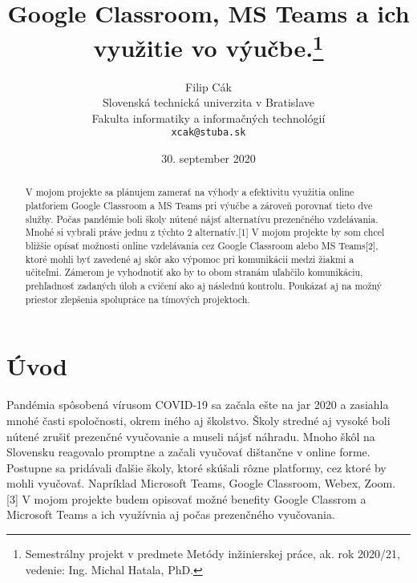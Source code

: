 \documentclass[10pt,twoside,slovak,a4paper]{article}
\title{Google Classroom,  MS Teams a ich využitie vo výučbe.\thanks{Semestrálny projekt v predmete Metódy inžinierskej práce, ak. rok 2020/21, vedenie: Ing. Michal Hatala, PhD. }}
\author{Filip Cák\\[2pt]
	{\small Slovenská technická univerzita v Bratislave}\\
	{\small Fakulta informatiky a informačných technológií}\\
	{\small \texttt{xcak@stuba.sk}}
	}
\date{\small 30. september 2020} %
\begin{document}
\maketitle

\begin{abstract}
V mojom projekte sa plánujem zamerať na výhody a efektivitu využitia online platforiem Google Classroom a MS Teams pri výučbe a zároveň porovnať tieto dve služby. Počas pandémie boli školy nútené nájsť alternatívu prezenčného vzdelávania. Mnohé si vybrali práve jednu z týchto 2 alternatív.[1] V mojom projekte by som chcel bližšie opísať možnosti online vzdelávania cez Google Classroom alebo MS Teams[2], ktoré mohli byť zavedené aj skôr ako výpomoc pri komunikácii medzi žiakmi a učiteľmi. Zámerom je vyhodnotiť ako by to obom stranám uľahčilo komunikáciu, prehľadnosť zadaných úloh a cvičení ako aj následnú kontrolu. Poukázať aj na možný priestor zlepšenia spolupráce na tímových projektoch.
\end{abstract}



\section{Úvod}

Pandémia spôsobená vírusom COVID-19 sa začala ešte na jar 2020 a zasiahla mnohé časti spoločnosti, okrem iného aj školstvo. Školy stredné aj vysoké boli nútené zrušiť prezenčné vyučovanie a museli nájsť náhradu. Mnoho škôl na Slovensku reagovalo promptne a začali vyučovať dištančne v online forme. Postupne sa pridávali ďalšie školy, ktoré skúšali rôzne platformy, cez ktoré by mohli vyučovať. Napríklad Microsoft Teams, Google Classroom, Webex, Zoom. [3] V mojom projekte budem opisovať možné benefity Google Classrom a Microsoft Teams a ich využívnia aj počas prezenčného vyučovania.
 


\end{document}
